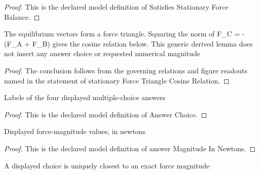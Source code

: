 \begin{proof}
  This is the declared model definition of Satisfies Stationary Force Balance.
\end{proof}
\begin{lemma}
  \label{lem:physics:phyx-mini-0756:phyxminiproblems-problemphyxmini0756-stationaryforcetrianglecosinerelation}
  The equilibrium vectors form a force triangle. Squaring the norm of F\_C = -(F\_A + F\_B) gives the cosine relation below. This generic derived lemma does not insert any answer choice or requested numerical magnitude
\end{lemma}
\begin{proof}
  The conclusion follows from the governing relations and figure readouts named in the statement of stationary Force Triangle Cosine Relation.
\end{proof}
\begin{definition}
  \label{def:physics:phyx-mini-0756:phyxminiproblems-problemphyxmini0756-answerchoice}
  Labels of the four displayed multiple-choice answers
\end{definition}
\begin{proof}
  This is the declared model definition of Answer Choice.
\end{proof}
\begin{definition}
  \label{def:physics:phyx-mini-0756:phyxminiproblems-problemphyxmini0756-answermagnitudeinnewtons}
  Displayed force-magnitude values, in newtons
\end{definition}
\begin{proof}
  This is the declared model definition of answer Magnitude In Newtons.
\end{proof}
\begin{definition}
  \label{def:physics:phyx-mini-0756:phyxminiproblems-problemphyxmini0756-isclosestdisplayedanswer}
  A displayed choice is uniquely closest to an exact force magnitude
\end{definition}
